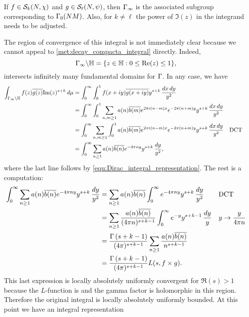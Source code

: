       \begin{remark}
        If $f \in \mathcal{S}_{k}(N,\chi)$ and $g \in \mathcal{S}_{\ell}(N,\psi)$, then $\Gamma_{\infty}$ is the associated subgroup corresponding to $\Gamma_{0}(NM)$. Also, for $k \neq \ell$ the power of $\Im(z)$ in the integrand needs to be adjusted.
      \end{remark}
      
      The region of convergence of this integral is not immediately clear because we cannot appeal to \cref{met:decay_compacta_integral} directly. Indeed,
      \[
        \Gamma_{\infty}\backslash\mathbb{H} = \{z \in \mathbb{H}:0 \le \mathrm{Re}(z) \le 1 \},
      \]
      intersects infinitely many fundamental domains for $\Gamma$. In any case, we have
      \begin{align*}
        \int_{\Gamma_{\infty}\backslash\mathbb{H}}f(z)\overline{g(z)}\mathrm{Im}(z)^{s+k}\,d\mu &= \int_{0}^{\infty}\int_{0}^{1}f(x+iy)\overline{g(x+iy)}y^{s+k}\,\frac{dx\,dy}{y^{2}} \\
        &= \int_{0}^{\infty}\int_{0}^{1}\sum_{n,m \ge 1}a(n)\overline{b(m)}e^{2\pi i(n-m)x}e^{-2\pi(n+m)y}y^{s+k}\,\frac{dx\,dy}{y^{2}} \\
        &= \int_{0}^{\infty}\sum_{n,m \ge 1}\int_{0}^{1}a(n)\overline{b(m)}e^{2\pi i(n-m)x}e^{-2\pi(n+m)y}y^{s+k}\,\frac{dx\,dy}{y^{2}} && \text{DCT} \\
        &= \int_{0}^{\infty}\sum_{n \ge 1}a(n)\overline{b(n)}e^{-4\pi ny}y^{s+k}\,\frac{dy}{y^{2}},
      \end{align*}
      where the last line follows by \cref{equ:Dirac_integral_representation}. The rest is a computation:
      \begin{align*}
        \int_{0}^{\infty}\sum_{n \ge 1}a(n)\overline{b(n)}e^{-4\pi ny}y^{s+k}\,\frac{dy}{y^{2}} &= \sum_{n \ge 1}a(n)\overline{b(n)}\int_{0}^{\infty}e^{-4\pi ny}y^{s+k}\,\frac{dy}{y^{2}} &&\text{DCT} \\
        &= \sum_{n \ge 1}\frac{a(n)\overline{b(n)}}{(4\pi n)^{s+k-1}}\int_{0}^{\infty}e^{-y}y^{s+k-1}\,\frac{dy}{y} &&\text{$y \to \frac{y}{4\pi n}$} \\
        &= \frac{\Gamma\left(s+k-1\right)}{(4\pi)^{s+k-1}}\sum_{n \ge 1}\frac{a(n)\overline{b(n)}}{n^{s+k-1}} \\
        &= \frac{\Gamma\left(s+k-1\right)}{(4\pi)^{s+k-1}}L(s,f \times g).
      \end{align*}
      This last expression is locally absolutely uniformly convergent for $\Re(s) > 1$ because the $L$-function is and the gamma factor is holomorphic in this region. Therefore the original integral is locally absolutely uniformly bounded. At this point we have an integral representation
